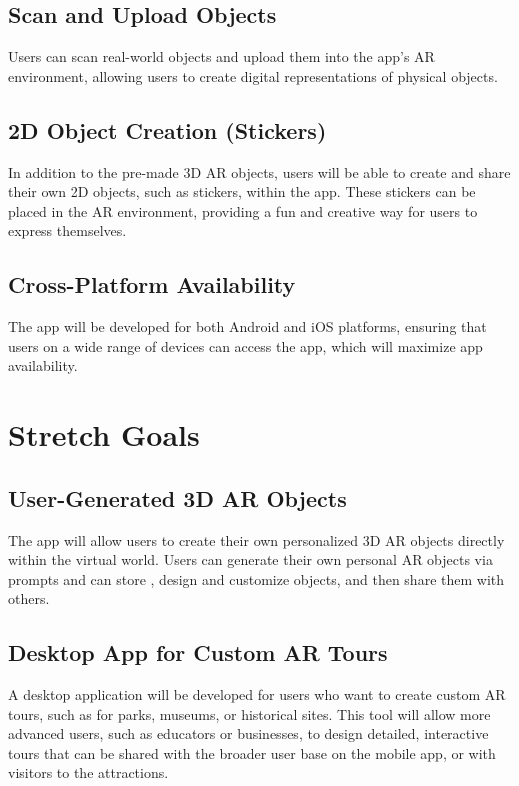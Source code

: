\documentclass{article}
\begin{document}
\subsection{Scan and Upload Objects}
Users can scan real-world objects and upload them into the app's AR environment, allowing users to create digital representations of physical objects.

\subsection{2D Object Creation (Stickers)}
In addition to the pre-made 3D AR objects, users will be able to create and share their own 2D objects, such as stickers, within the app. These stickers can be placed in the AR environment, providing a fun and creative way for users to express themselves.

\subsection{Cross-Platform Availability}
The app will be developed for both Android and iOS platforms, ensuring that users on a wide range of devices can access the app, which will maximize app availability.

\section{Stretch Goals}

\subsection{User-Generated 3D AR Objects}
The app will allow users to create their own personalized 3D AR objects directly within the virtual world. Users can generate their own personal AR objects via prompts and can store , design and customize objects, and then share them with others.

\subsection{Desktop App for Custom AR Tours}
A desktop application will be developed for users who want to create custom AR tours, such as for parks, museums, or historical sites. This tool will allow more advanced users, such as educators or businesses, to design detailed, interactive tours that can be shared with the broader user base on the mobile app, or with visitors to the attractions.
\end{document}
